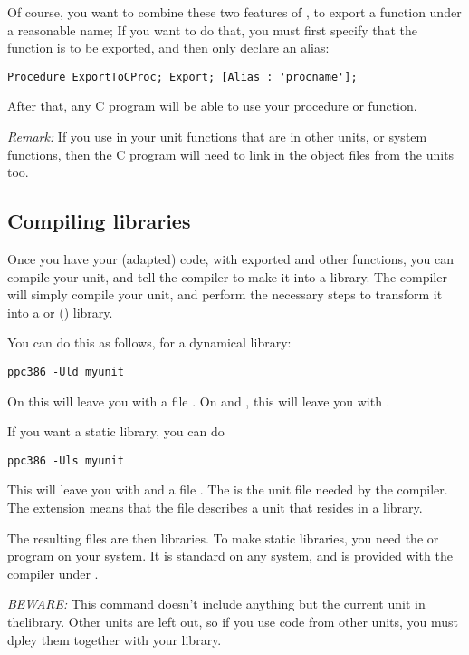 \documentclass{report}
\begin{document}
Of course, you want to combine these two features of \fpc, to export a
function under a reasonable name; If you want to do that, you must first
specify that the function is to be exported, and then only declare an alias:
\begin{verbatim}
Procedure ExportToCProc; Export; [Alias : 'procname'];
\end{verbatim}
After that, any C program will be able to use your procedure or function.

{\em Remark: }
If you use in your unit functions that are in other units, or
system functions, then the C program will need to link in the object files
from the units too.

\subsection {Compiling libraries}

Once you have your (adapted) code, with exported and other functions,
you can compile your unit, and tell the compiler to make it into a library.
The compiler will simply compile your unit, and perform the necessary steps
to transform it into a  or  () library.

You can do this as follows, for a dynamical library:
\begin{verbatim}
ppc386 -Uld myunit
\end{verbatim}
On \linux this will leave you with a file . On \windows
and \ostwo, this will leave you with .

If you want a static library, you can do
\begin{verbatim}
ppc386 -Uls myunit
\end{verbatim}
This will leave you with  and a file .
The  is the unit file needed by the \fpc compiler.
The extension  means that the file describes a unit that resides
in a library.

The resulting files are then libraries. To make static libraries, you need
the  or  program on your system. It is standard on any
\linux system, and is provided with the  compiler under \dos.

{\em BEWARE:} This command doesn't include anything but the current unit in
thelibrary. Other units are left out, so if you use code from other units,
you must dpley them together with your library.
\end{document}
